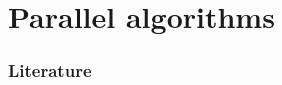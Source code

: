 \documentclass{beamer}
\begin{document}
\section{Parallel algorithms}
\begin{frame}

\end{frame}



\begin{comment}
\section{Preflow-Push}
\begin{frame}
	\frametitle{Preflow-Push Algorithm}
	\begin{itemize}
		\item Push flow along individual arks instead of paths from $s$ to $t$
		\item Excess flow $e_f(v) \geq 0$ $\forall v \in V$\\
	\end{itemize}

	\begin{figure}
	\begin{tikzpicture}[scale=1.8, auto,swap]
	    \foreach \pos/\name in {{(0,2)/s}, {(1.5,3)/v_1}, {(3,3)/v_2},
    	                        {(1.5,1)/v_3}, {(3,1)/v_4}, {(4.5,2)/t}}
        \node[vertex] (\name) at \pos {$\name$};
    	\foreach \source/ \dest /\weight in {s/v_1/12, s/v_3/11,v_3/v_1/5,v_1/v_4/9,
                                         v_1/v_2/7, v_4/v_2/15, v_3/v_4/5,
                                         v_2/t/8, v_4/t/9}
        	\path[edge] (\source) -- node[weight] {$\weight$} (\dest);
        	\path[edge] (v_4) to[bend right] node[weight] {6}  (v_1);
  
	    \begin{pgfonlayer}{background}
	        \pause
    	    \foreach \source /\dest  /\weight in {s/v_3/11,s/v_1/12}
	            \path[selected edge] (\source) -- node[weight,above] {$\weight$} (\dest);
	            \node[vertex,label={[color=blue]80:$+12$}] (v_1) at (1.5,3) {$v_1$};
	            \node[vertex,label={[color=blue]280:$+11$}] (v_3) at (1.5,1) {$v_3$};
	           

    	\end{pgfonlayer}
	\end{tikzpicture}
	\end{figure}	
\end{frame} 
\end{comment}
 	 
\begin{frame}[allowframebreaks]
\frametitle<presentation>{Literature}    
\printbibliography
\end{frame} 	 
 	 
\end{document}
